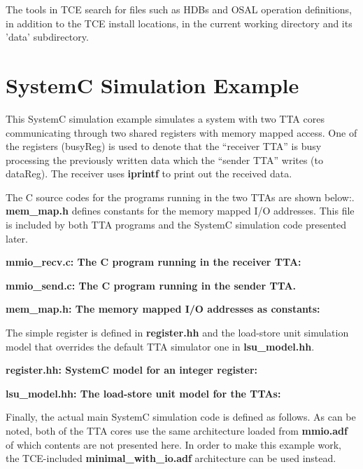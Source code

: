 \documentclass[twoside]{tceusermanual}
\begin{document}
The tools in TCE search for files such as HDBs and OSAL operation definitions,
in addition to the TCE install locations, in the current working directory and
its 'data' subdirectory. 

\chapter{SystemC Simulation Example}
\label{appendix:SystemCExample}

This SystemC simulation example simulates a system with two TTA cores
communicating through two shared registers with memory mapped access.
One of the registers (busyReg) is used to denote that the ``receiver TTA'' is
busy processing the previously written data which the ``sender TTA'' writes
(to dataReg). The receiver uses \textbf{iprintf} to print out the received data.

The C source codes for the programs running in the two TTAs 
are shown below:. \textbf{mem\_map.h} defines constants for the memory 
mapped I/O addresses. This file is 
included by both TTA programs and the SystemC simulation code presented
later.

\textbf{mmio\_recv.c: The C program running in the receiver TTA:}



\textbf{mmio\_send.c: The C program running in the sender TTA.}


\textbf{mem\_map.h: The memory mapped I/O addresses as constants:}
 


The simple register is defined in \textbf{register.hh} and the
load-store unit simulation model that overrides the default TTA simulator
one in \textbf{lsu\_model.hh}.

\textbf{register.hh: SystemC model for an integer register:}
 


\textbf{lsu\_model.hh: The load-store unit model for the TTAs:}



Finally, the actual main SystemC simulation code is defined as follows.
As can be noted, both of the TTA cores use the same architecture loaded from
\textbf{mmio.adf} of which contents are not presented here. In order to 
make this example work, the TCE-included \textbf{minimal\_with\_io.adf} 
architecture can be used instead.
\end{document}
